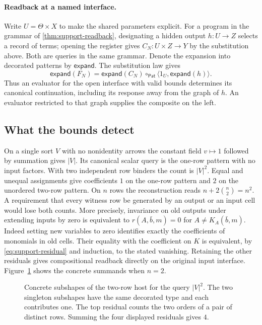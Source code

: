 \documentclass[11pt,a4paper]{article}
\theoremstyle{definition}
\theoremstyle{remark}\newaliascnt{remark}{theorem}
\numberwithin{equation}{section}
\begin{document}
\paragraph{Readback at a named interface.}
Write \(U=\Theta\times X\) to make the shared parameters explicit. For a program in the grammar of \cref{thm:support-readback}, designating a hidden output \(h:U\to Z\) selects a record of terms; opening the register gives \(C_N:U\times Z\to Y\) by the substitution above. Both are queries in the same grammar. Denote the expansion into decorated patterns by \(\mathsf{expand}\). The substitution law gives
\[
 \mathsf{expand}(F_N)
 =\mathsf{expand}(C_N)\circ_{\mathsf{Pat}}
       \langle 1_U,\mathsf{expand}(h)\rangle .
\]
Thus an evaluator for the open interface with valid bounds determines its canonical continuation, including its response away from the graph of \(h\). An evaluator restricted to that graph supplies the composite on the left.

\subsection{What the bounds detect}
On a single sort $V$ with no nonidentity arrows the constant field $v\mapsto1$ followed by summation gives $|V|$. Its canonical scalar query is the one-row pattern with no input factors. With two independent row binders the count is $|V|^2$. Equal and unequal assignments give coefficients $1$ on the one-row pattern and $2$ on the unordered two-row pattern. On $n$ rows the reconstruction reads $n+2\binom n2=n^2$. A requirement that every witness row be generated by an output or an input cell would lose both counts. More precisely, invariance on old outputs under extending inputs by zero is equivalent to $r(A,\bar b,m)=0$ for $A\ne K_A(\bar b,m)$. Indeed setting new variables to zero identifies exactly the coefficients of monomials in old cells. Their equality with the coefficient on $K$ is equivalent, by \eqref{eq:support-residual} and induction, to the stated vanishing. Retaining the other residuals gives compositional readback directly on the original input interface. Figure~\ref{fig:two-row-interval} shows the concrete summands when $n=2$.

\begin{figure}[!htbp]
    \centering\small
    \caption{Concrete subshapes of the two-row host for the query $|V|^2$. The two singleton subshapes have the same decorated type and each contributes one. The top residual counts the two orders of a pair of distinct rows. Summing the four displayed residuals gives $4$.}
    \label{fig:two-row-interval}
\end{figure}
\end{document}

